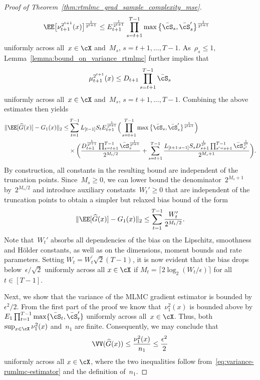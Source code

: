 \documentclass[11pt]{article}
\let\hat\widehat
\begin{document}
\begin{proof}[Proof of Theorem~\ref{thm:rtmlmc_grad_sample_complexity_mse}]
    \begin{align*}
        \EE \big[\nu_{t+1}^{2^{t+1}}(x) \big]^\frac{1}{2^{t+1}}
       & \leq E_{t+1}^\frac{1}{2^{t+1}} \prod_{s=t+1}^{T-1} \max\big\{ \bar\cS_s, \bar\cS_s^\prime \big\}^\frac{1}{2^{t+1}}
    \end{align*}
    uniformly across all~$x\in\cX$ and~$M_s$, $s=t+1,\ldots, T-1$. As~$\rho_{s}\leq 1$, Lemma~\ref{lemma:bound_on_variance_rtmlmc} further implies that
    \begin{align*}
        \mu_{t+1}^{2^{t+1}}(x) \leq  D_{t+1} \prod_{s=t+1}^{T-1} \bar\cS_s
    \end{align*}
    uniformly across all~$x\in\cX$ and~$M_s$, $s=t+1,\ldots, T-1$. Combining the above estimates then yields
    \begin{align*}
        \|\EE[\hat{G}(x)]-G_1(x)\|_2 \leq & \sum_{t=1}^{T-1} L_{[t-1]}S_t  E_{t+1}^\frac{1}{2^{t+1}} \Big(\prod_{s=t+1}^{T-1}\textstyle\max\big\{\bar\cS_s, \bar\cS_s^\prime\big\}^\frac{1}{2^{t+1}}\Big)\\
        &\times\bigg( \frac{ D_{t+1}^{\frac{1}{2^{t+1}}} \prod_{s=t+1}^{T-1} \bar\cS_s^\frac{1}{2^{t+1}}}{2^{M_t/2}}  + \sum_{s=t+1}^{T-1} \frac{L_{[t+1:s-1]}S_s D_{s+1}^{\frac{1}{2^{s}}} \prod_{s'=s+1}^{T-1} \bar\cS_{s'}^\frac{1}{2^{s}}}{2^{M_s+1}} \bigg).
    \end{align*}
    By construction, all constants in the resulting bound are independent of the truncation points. Since~$M_s \geq 0$, we can lower bound the denominator~$2^{M_s+1}$ by~$2^{M_s/2}$ and introduce auxiliary constants~$W_t' \geq 0$ that are independent of the truncation points to obtain a simpler but relaxed bias bound of the form
    \begin{align*}
        \|\EE[\hat{G}(x)] - G_1(x)\|_2 \leq \sum_{t=1}^{T-1} \frac{W_t'}{2^{M_t/2}}.
    \end{align*}
    Note that~$W_t'$ absorbs all dependencies of the bias on the Lipschitz, smoothness and Hölder constants, as well as on the dimensions, moment bounds and rate parameters. Setting $W_t=W^\prime_t \sqrt{2}(T-1)$, it is now evident that the bias drops below~$\epsilon / \sqrt{2}$ uniformly across all $x\in\cX$ if $M_{t}  =\lceil 2\log_2(W_t /\epsilon)\rceil$ for all $t\in[T-1]$. 

    Next, we show that the variance of the MLMC gradient estimator is bounded by $\epsilon^2/2$. From the first part of the proof we know that~$\nu_1^2(x)$ is bounded above by $E_1 \prod_{t=1}^{T-1}\max \{\bar\cS_t,\bar\cS_t^\prime \}$ uniformly across all~$x\in\cX$. Thus, both $\sup_{x\in\cX} \nu_1^2(x)$ and~$n_1$ are finite. Consequently, we may conclude that
    \[
        \VV(\hat{G}(x)) \leq \frac{\nu_1^2(x)}{n_1} \leq \frac{\epsilon^2}{2}
    \]
    uniformly across all $x\in\cX$, where the two inequalities follow from~\eqref{eq:variance-rumlmc-estimator} and the definition of~$n_1$.
    

\end{proof}
\end{document}
